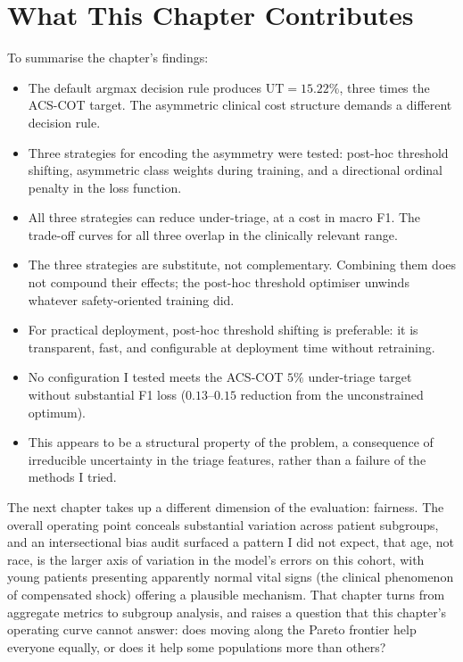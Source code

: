 \section{What This Chapter Contributes}

To summarise the chapter's findings:

\begin{itemize}
 \item The default argmax decision rule produces $\text{UT} = 15.22\%$, three times the ACS-COT target. The asymmetric clinical cost structure demands a different decision rule.
 \item Three strategies for encoding the asymmetry were tested: post-hoc threshold shifting, asymmetric class weights during training, and a directional ordinal penalty in the loss function.
 \item All three strategies can reduce under-triage, at a cost in macro F1. The trade-off curves for all three overlap in the clinically relevant range.
 \item The three strategies are substitute, not complementary. Combining them does not compound their effects; the post-hoc threshold optimiser unwinds whatever safety-oriented training did.
 \item For practical deployment, post-hoc threshold shifting is preferable: it is transparent, fast, and configurable at deployment time without retraining.
 \item No configuration I tested meets the ACS-COT $5\%$ under-triage target without substantial F1 loss ($0.13$--$0.15$ reduction from the unconstrained optimum).
 \item This appears to be a structural property of the problem, a consequence of irreducible uncertainty in the triage features, rather than a failure of the methods I tried.
\end{itemize}

The next chapter takes up a different dimension of the evaluation: fairness. The overall operating point conceals substantial variation across patient subgroups, and an intersectional bias audit surfaced a pattern I did not expect, that age, not race, is the larger axis of variation in the model's errors on this cohort, with young patients presenting apparently normal vital signs (the clinical phenomenon of compensated shock) offering a plausible mechanism. That chapter turns from aggregate metrics to subgroup analysis, and raises a question that this chapter's operating curve cannot answer: does moving along the Pareto frontier help everyone equally, or does it help some populations more than others?
